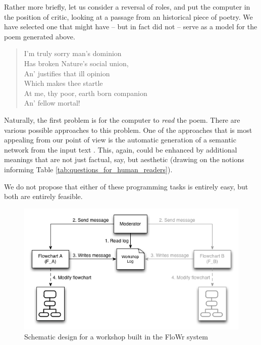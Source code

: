 Rather more briefly, let us consider a reversal of roles, and put the
computer in the position of critic, looking at a passage from an
historical piece of poetry.  We have selected one that might have --
but in fact did not -- serve as a model for the poem generated above.

{\itshape
\begin{verse}
I'm truly sorry man's dominion\\
Has broken Nature's social union,\\
An' justifies that ill opinion\\
Which makes thee startle\\
At me, thy poor, earth born companion\\
An' fellow mortal!\\
\end{verse}
}

Naturally, the first problem is for the computer to \emph{read} the
poem.  There are various possible approaches to this problem.  One of
the approaches that is most appealing from our point of view is the
automatic generation of a semantic network from the input text
\cite{harrington2007asknet}.  This, again, could be enhanced by
additional meanings that are not just factual, say, but aesthetic
(drawing on the notions informing Table
\ref{tab:questions_for_human_readers}).

We do not propose that either of these programming tasks is entirely
easy, but both are entirely feasible.


\begin{figure}
\includegraphics[width=\columnwidth,trim = 0mm 0mm 2mm 0mm,clip=true]{figures/workshop-diagram}
\caption{Schematic design for a workshop built in the FloWr system}
\end{figure}

